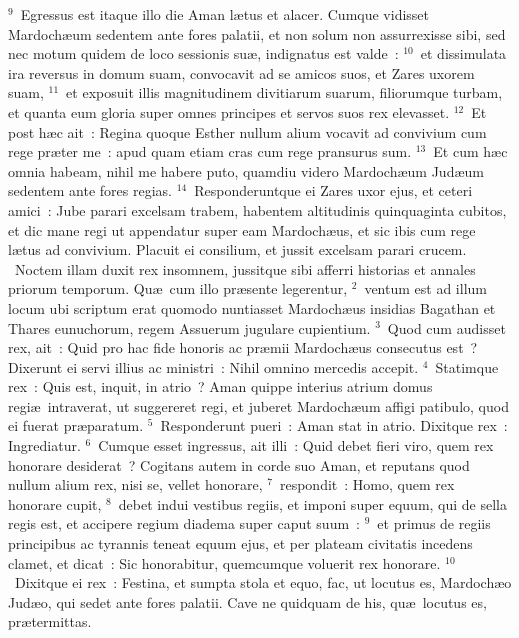 ${}^{9}$~Egressus est itaque illo die Aman l\ae tus et alacer. Cumque vidisset Mardoch\ae um sedentem ante fores palatii, et non solum non assurrexisse sibi, sed nec motum quidem de loco sessionis su\ae , indignatus est valde~:
${}^{10}$~et dissimulata ira reversus in domum suam, convocavit ad se amicos suos, et Zares uxorem suam,
${}^{11}$~et exposuit illis magnitudinem divitiarum suarum, filiorumque turbam, et quanta eum gloria super omnes principes et servos suos rex elevasset.
${}^{12}$~Et post h\ae c ait~: Regina quoque Esther nullum alium vocavit ad convivium cum rege pr\ae ter me~: apud quam etiam cras cum rege pransurus sum.
${}^{13}$~Et cum h\ae c omnia habeam, nihil me habere puto, quamdiu videro Mardoch\ae um Jud\ae um sedentem ante fores regias.
${}^{14}$~Responderuntque ei Zares uxor ejus, et ceteri amici~: Jube parari excelsam trabem, habentem altitudinis quinquaginta cubitos, et dic mane regi ut appendatur super eam Mardoch\ae us, et sic ibis cum rege l\ae tus ad convivium. Placuit ei consilium, et jussit excelsam parari crucem.
~\lettrine[lines=10,image=true,loversize=0.05,lraise=-0.03]{N}{}octem illam duxit rex insomnem, jussitque sibi afferri historias et annales priorum temporum. Qu\ae\ cum illo pr\ae sente legerentur,
${}^{2}$~ventum est ad illum locum ubi scriptum erat quomodo nuntiasset Mardoch\ae us insidias Bagathan et Thares eunuchorum, regem Assuerum jugulare cupientium.
${}^{3}$~Quod cum audisset rex, ait~: Quid pro hac fide honoris ac pr\ae mii Mardoch\ae us consecutus est~? Dixerunt ei servi illius ac ministri~: Nihil omnino mercedis accepit.
${}^{4}$~Statimque rex~: Quis est, inquit, in atrio~? Aman quippe interius atrium domus regi\ae\ intraverat, ut suggereret regi, et juberet Mardoch\ae um affigi patibulo, quod ei fuerat pr\ae paratum.
${}^{5}$~Responderunt pueri~: Aman stat in atrio. Dixitque rex~: Ingrediatur.
${}^{6}$~Cumque esset ingressus, ait illi~: Quid debet fieri viro, quem rex honorare desiderat~? Cogitans autem in corde suo Aman, et reputans quod nullum alium rex, nisi se, vellet honorare,
${}^{7}$~respondit~: Homo, quem rex honorare cupit,
${}^{8}$~debet indui vestibus regiis, et imponi super equum, qui de sella regis est, et accipere regium diadema super caput suum~:
${}^{9}$~et primus de regiis principibus ac tyrannis teneat equum ejus, et per plateam civitatis incedens clamet, et dicat~: Sic honorabitur, quemcumque voluerit rex honorare.
${}^{10}$~Dixitque ei rex~: Festina, et sumpta stola et equo, fac, ut locutus es, Mardoch\ae o Jud\ae o, qui sedet ante fores palatii. Cave ne quidquam de his, qu\ae\ locutus es, pr\ae termittas.
